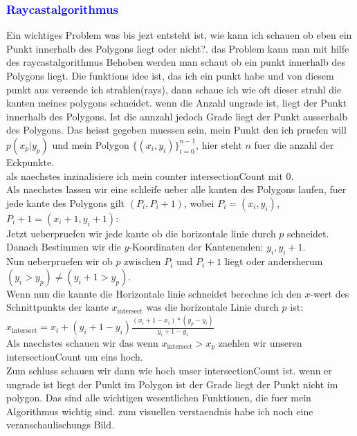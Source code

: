 \documentclass{article}
\begin{document}
\subsubsection{\textcolor{blue}{Raycastalgorithmus}}
Ein wichtiges Problem was bis jezt entsteht ist, wie kann ich schauen ob eben ein Punkt innerhalb des Polygons liegt oder nicht?. das Problem kann man mit hilfe des raycastalgorithmus Behoben werden man schaut ob ein punkt innerhalb des Polygons liegt. Die funktions idee ist, das ich ein punkt habe und von diesem punkt aus versende ich strahlen(rays), dann schaue ich wie oft dieser strahl die kanten meines polygons schneidet. wenn die Anzahl ungrade ist, liegt der Punkt innerhalb des Polygons. Ist die annzahl jedoch Grade liegt der Punkt ausserhalb des Polygons. Das heisst gegeben muessen sein, mein Punkt den ich pruefen will $p(x_p|y_p)$ und mein Polygon \( \{ (x_i, y_i) \}_{i=0}^{n-1} \), hier steht $n$ fuer die anzahl der Eckpunkte.
\\
als naechstes inzinalisiere ich mein counter intersectionCount mit 0.
\\
Als naechstes lassen wir eine schleife ueber alle kanten des Polygons laufen, fuer jede kante des Polygons gilt $(P_i,P_i+1)$, wobei $P_i = (x_i,y_i)$, $P_i+1 = (x_i+1, y_i+1)$: 
\\
Jetzt ueberpruefen wir jede kante ob die horizontale linie durch $p$ schneidet.
\\
Danach Bestimmen wir die $y$-Koordinaten der Kantenenden: $y_i, y_i+1$.
\\
Nun ueberpruefen wir ob $p$ zwischen $P_i$ und $P_i+1$ liegt oder andersherum $(y_i > y_p) \neq (y_i+1 > y_p)$.
\\
Wenn nun die kannte die Horizontale linie schneidet berechne ich den $x$-wert des Schnittpunkts der kante $x_\text{intersect}$ was die horizontale Linie durch $p$ ist:
\\
$x_\text{intersect} = x_i + (y_i+1 - y_i)\frac{(x_i+1 - x_i) * (y_p - y_i)}{y_i+1 - y_i}$
\\
Als naechstes schauen wir das wenn $x_\text{intersect} > x_p$ zaehlen wir unseren intersectionCount um eins hoch.
\\
Zum schluss schauen wir dann wie hoch unser intersectionCount ist.  wenn er ungrade ist liegt der Punkt im Polygon ist der Grade liegt der Punkt nicht im polygon. Das sind alle wichtigen wesentlichen Funktionen, die fuer mein Algorithmus wichtig sind. zum visuellen verstaendnis habe ich noch eine veranschaulischungs Bild.
\\
\end{document}

